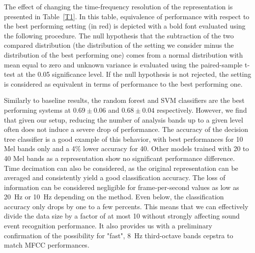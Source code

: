 \documentclass[sensors,article,submit,moreauthors,pdftex,10pt,a4paper]{mdpi}
\begin{document}
The effect of changing the time-frequency resolution of the representation is presented in Table~\ref{T1}. In this table, equivalence of performance with respect to the best performing setting (in red) is depicted with a bold font evaluated using the following procedure. The null hypothesis that the subtraction of the two compared distribution (the distribution of the setting we consider minus the distribution of the best performing one) comes from a normal distribution with mean equal to zero and unknown variance is evaluated using the paired-sample t-test at the 0.05 significance level. If the null hypothesis is not rejected, the setting is considered as equivalent in terms of performance to the best performing one.

Similarly to baseline results, the random forest and SVM classifiers are the best performing systems at $0.69\pm 0.06$ and $0.68\pm 0.04$ respectively. However, we find that given our setup, reducing the number of analysis bands up to a given level often does not induce a severe drop of performance. The accuracy of the decision tree classifier is a good example of this behavior, with best performances for 10 Mel bands only and a 4\% lower accuracy for 40. Other models trained with 20 to 40 Mel bands as a representation show no significant performance difference. Time decimation can also be considered, as the original representation can be averaged and consistently yield a good classification accuracy. The loss of information can be considered negligible for frame-per-second values as low as 20~Hz or 10~Hz depending on the method. Even below, the classification accuracy only drops by one to a few percents. This means that we can effectively divide the data size by a factor of at most 10 without strongly affecting sound event recognition performance. It also provides us with a preliminary confirmation of the possibility for "fast", 8~Hz third-octave bands cepstra to match MFCC performances.\\
\end{document}
